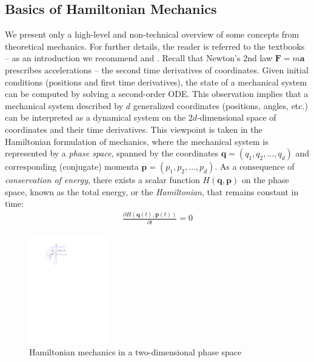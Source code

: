 \documentclass[final,3p,mathptmx]{elsarticle}
\begin{document}
\subsection{Basics of Hamiltonian Mechanics}
We present only a high-level and non-technical overview of some concepts from theoretical mechanics. For further details, the reader is referred to the textbooks -- as an introduction we recommend \cite{susskind2013theoretical} and \cite{hand1998analytical}. Recall that Newton's 2nd law $\mathbf{F} = m\mathbf{a}$ prescribes accelerations -- the second time derivatives of coordinates. Given initial conditions (positions and first time derivatives), the state of a mechanical system can be computed by solving a second-order ODE. This observation implies that a mechanical system described by $d$ generalized coordinates (positions, angles, etc.) can be interpreted as a dynamical system on the $2d$-dimensional space of coordinates and their time derivatives. This viewpoint is taken in the Hamiltonian formulation of mechanics, where the mechanical system is represented by a \emph{phase space}, spanned by the coordinates $\mathbf{q} = (q_{1}, q_{2}, \ldots, q_{d})$ and corresponding (conjugate) momenta $\mathbf{p} = (p_{1}, p_{2}, \ldots, p_{d})$. As a consequence of \emph{conservation of energy}, there exists a scalar function $H(\mathbf{q},\mathbf{p})$ on the phase space, known as the total energy, or the \emph{Hamiltonian}, that remains constant in time:
\begin{align}
\frac{\partial H(\mathbf{q}(t),\mathbf{p}(t))}{\partial t} = 0
\end{align}

\begin{figure}[h]
	\centering
	\includegraphics[width=0.3\textwidth, keepaspectratio]{figures/hamiltonian2.pdf}
	\caption{Hamiltonian mechanics in a two-dimensional phase space}
	\label{fig:hamiltonian}
\end{figure}
\end{document}
